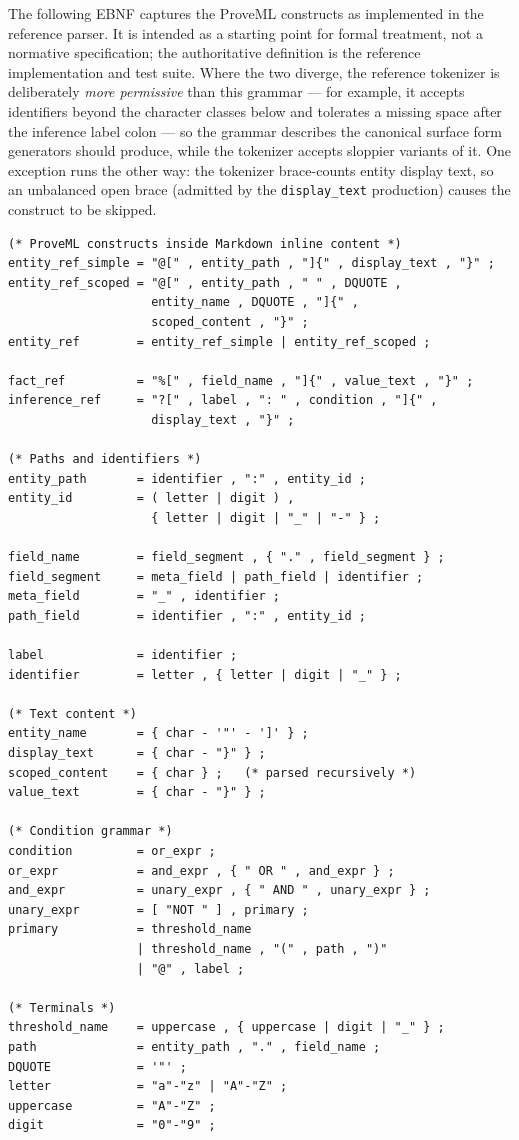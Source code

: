 \documentclass[11pt,a4paper]{article}
\begin{document}
The following EBNF captures the ProveML constructs as implemented in the reference parser. It is intended as a starting point for formal treatment, not a normative specification; the authoritative definition is the reference implementation and test suite. Where the two diverge, the reference tokenizer is deliberately \textit{more permissive} than this grammar --- for example, it accepts identifiers beyond the character classes below and tolerates a missing space after the inference label colon --- so the grammar describes the canonical surface form generators should produce, while the tokenizer accepts sloppier variants of it. One exception runs the other way: the tokenizer brace-counts entity display text, so an unbalanced open brace (admitted by the \texttt{display\_text} production) causes the construct to be skipped.

\begin{lstlisting}
(* ProveML constructs inside Markdown inline content *)
entity_ref_simple = "@[" , entity_path , "]{" , display_text , "}" ;
entity_ref_scoped = "@[" , entity_path , " " , DQUOTE ,
                    entity_name , DQUOTE , "]{" ,
                    scoped_content , "}" ;
entity_ref        = entity_ref_simple | entity_ref_scoped ;

fact_ref          = "%[" , field_name , "]{" , value_text , "}" ;
inference_ref     = "?[" , label , ": " , condition , "]{" ,
                    display_text , "}" ;

(* Paths and identifiers *)
entity_path       = identifier , ":" , entity_id ;
entity_id         = ( letter | digit ) ,
                    { letter | digit | "_" | "-" } ;

field_name        = field_segment , { "." , field_segment } ;
field_segment     = meta_field | path_field | identifier ;
meta_field        = "_" , identifier ;
path_field        = identifier , ":" , entity_id ;

label             = identifier ;
identifier        = letter , { letter | digit | "_" } ;

(* Text content *)
entity_name       = { char - '"' - ']' } ;
display_text      = { char - "}" } ;
scoped_content    = { char } ;   (* parsed recursively *)
value_text        = { char - "}" } ;

(* Condition grammar *)
condition         = or_expr ;
or_expr           = and_expr , { " OR " , and_expr } ;
and_expr          = unary_expr , { " AND " , unary_expr } ;
unary_expr        = [ "NOT " ] , primary ;
primary           = threshold_name
                  | threshold_name , "(" , path , ")"
                  | "@" , label ;

(* Terminals *)
threshold_name    = uppercase , { uppercase | digit | "_" } ;
path              = entity_path , "." , field_name ;
DQUOTE            = '"' ;
letter            = "a"-"z" | "A"-"Z" ;
uppercase         = "A"-"Z" ;
digit             = "0"-"9" ;
\end{lstlisting}
\end{document}
